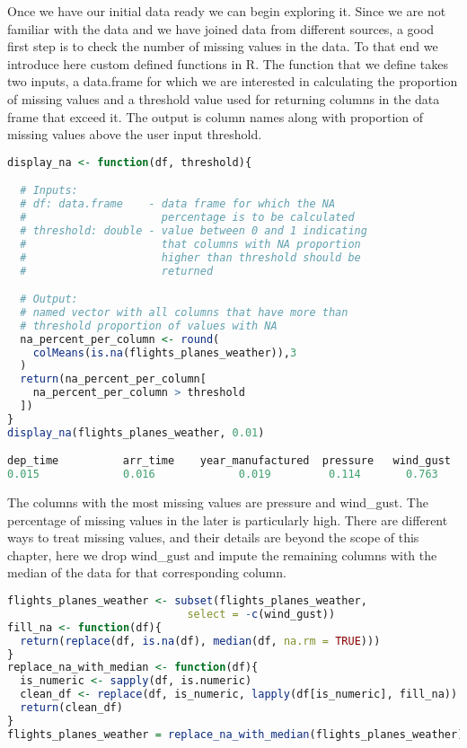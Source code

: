Once we have our initial data ready we can begin exploring it. Since we are not familiar with the data and we have joined data from different sources, a good first step is to check the number of missing values in the data. To that end we introduce here custom defined functions in R. The function that we define takes two inputs, a data.frame for which we are interested in calculating the proportion of missing values and a threshold value used for returning columns in the data frame that exceed it. The output is column names along with proportion of missing values above the user input threshold.
\begin{lstlisting}[language=R]
display_na <- function(df, threshold){

  # Inputs:
  # df: data.frame    - data frame for which the NA
  #                     percentage is to be calculated
  # threshold: double - value between 0 and 1 indicating
  #                     that columns with NA proportion
  #                     higher than threshold should be
  #                     returned

  # Output:
  # named vector with all columns that have more than
  # threshold proportion of values with NA
  na_percent_per_column <- round(
    colMeans(is.na(flights_planes_weather)),3
  )
  return(na_percent_per_column[
    na_percent_per_column > threshold
  ])
}
display_na(flights_planes_weather, 0.01)

dep_time          arr_time    year_manufactured  pressure   wind_gust
0.015             0.016             0.019         0.114       0.763
\end{lstlisting}
The columns with the most missing values are pressure and wind\_gust. The percentage of missing values in the later is particularly high. There are different ways to treat missing values, and their details are beyond the scope of this chapter, here we drop wind\_gust and impute the remaining columns with the median of the data for that corresponding column.
\begin{lstlisting}[language=R]
flights_planes_weather <- subset(flights_planes_weather,
                            select = -c(wind_gust))
fill_na <- function(df){
  return(replace(df, is.na(df), median(df, na.rm = TRUE)))
}
replace_na_with_median <- function(df){
  is_numeric <- sapply(df, is.numeric)
  clean_df <- replace(df, is_numeric, lapply(df[is_numeric], fill_na))
  return(clean_df)
}
flights_planes_weather = replace_na_with_median(flights_planes_weather)
\end{lstlisting}
